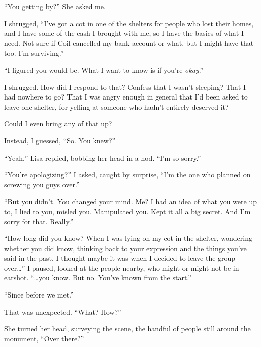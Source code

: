 ``You getting by?'' She asked me.



I shrugged, ``I've got a cot in one of the shelters for people who lost their homes, and I have some of the cash I brought with me, so I have the basics of what I need.  Not sure if Coil cancelled my bank account or what, but I might have that too.  I'm surviving.''



``I figured you would be.  What I want to know is if you're \emph{okay}.''



I shrugged.  How did I respond to that?  Confess that I wasn't sleeping?  That I had nowhere to go?  That I was angry enough in general that I'd been asked to leave one shelter, for yelling at someone who hadn't entirely deserved it?



Could I even bring any of that up?



Instead, I guessed, ``So.  You knew?''



``Yeah,'' Lisa replied, bobbing her head in a nod.  ``I'm so sorry.''



``You're apologizing?'' I asked, caught by surprise, ``I'm the one who planned on screwing you guys over.''



``But you didn't.  You changed your mind.  Me?  I had an idea of what you were up to, I lied to you, misled you.  Manipulated you.  Kept it all a big secret.  And I'm sorry for that.  Really.''



``How long did you know?  When I was lying on my cot in the shelter, wondering whether you did know, thinking back to your expression and the things you've said in the past, I thought maybe it was when I decided to leave the group over\ldots''  I paused, looked at the people nearby, who might or might not be in earshot.  ``\ldots{}you know.  But no.  You've known from the start.''



``Since before we met.''



That was unexpected.  ``What?  How?''



She turned her head, surveying the scene, the handful of people still around the monument, ``Over there?''



